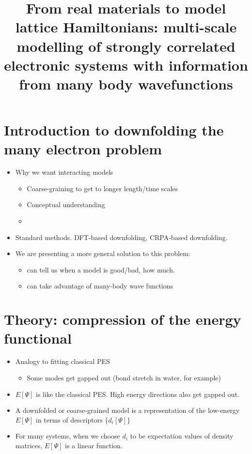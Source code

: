 \documentclass[prl,12pt,onecolumn,nofootinbib,notitlepage,english,superscriptaddress]{revtex4-1}
\newcommand{\lucas}[1]{{\color{GREEN}{\bf LKW: #1}}}
\begin{document}
\renewcommand{\thefootnote}{\fnsymbol{footnote}}
\renewcommand\abstractname{}
\title{From real materials to model lattice Hamiltonians: multi-scale modelling of strongly correlated electronic systems 
       with information from many body wavefunctions}

\maketitle




\section{Introduction to downfolding the many electron problem}
\begin{itemize}
\item Why we want interacting models
	\begin{itemize}
	\item Coarse-graining to get to longer length/time scales
	\item Conceptual understanding 
	\item \lucas{other thoughts?} 
	\end{itemize}
\item Standard methods. DFT-based downfolding, CRPA-based downfolding. \lucas{What is the issue with these methods? Accuracy? Being able to tell if a model is good or not? This will determine what we talk about in the paper. When are these methods good?} 
\item We are presenting a more general solution to this problem:
   \begin{itemize}
      \item  can tell us when a model is good/bad, how much.
      \item  can take advantage of many-body wave functions
    \end{itemize}
\end{itemize}

\section{Theory: compression of the energy functional}

\begin{itemize}
\item Analogy to fitting classical PES
    \begin{itemize}
    \item Some modes get gapped out (bond stretch in water, for example)
    \end{itemize}
\item $E[\Psi]$ is like the classical PES. High energy directions also get gapped out. 
\item A downfolded or coarse-grained model is a representation of the low-energy $E[\Psi]$ in terms of descriptors $\{d_i[\Psi]\}$
\item For many systems, when we choose $d_i$ to be expectation values of density matrices, $E[\Psi]$ is a linear function.
\end{itemize}
\end{document}
